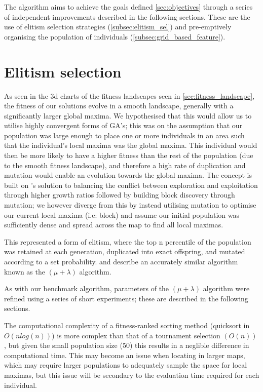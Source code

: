 \documentclass[authoryearcitations]{UoYCSproject}
\begin{document}
The algorithm aims to achieve the goals defined \autoref{sec:objectives} through a series of independent improvements described in the following sections. These are the use of elitism selection strategies (\autoref{subsec:elitism_sel}) and pre-emptively organising the population of individuals (\autoref{subsec:grid_based_feature}).


\section{Elitism selection}
\label{subsec:elitism_sel}
As seen in the 3d charts of the fitness landscapes seen in \autoref{sec:fitness_landscape}, the fitness of our solutions evolve in a smooth landscape, generally with a significantly larger global maxima. We hypothesised that this would allow us to utilise highly convergent forms of GA's; this was on the assumption that our population was large enough to place one or more individuals in an area such that the individual's local maxima was the global maxima. This individual would then be more likely to have a higher fitness than the rest of the population (due to the smooth fitness landscape), and therefore a high rate of duplication and mutation would enable an evolution towards the global maxima. The concept is built on \citet{David_E_Goldberg1991-es}'s solution to balancing the conflict between exploration and exploitation through higher growth ratios followed by building block discovery through mutation; we however diverge from this by instead utilising mutation to optimise our current local maxima (i.e: block) and assume our initial population was sufficiently dense and spread across the map to find all local maximas.
	
This represented a form of elitism, where the top n percentile of the population was retained at each generation, duplicated into exact offspring, and mutated according to a set probability. \citet{T_Back_D_B_Fogel_T_Michalewicz} and \citet{Shapiro1992-qm} describe an accurately similar algorithm known as the $(\mu + \lambda)$  algorithm.

As with our benchmark algorithm, parameters of the $(\mu + \lambda)$ algorithm were refined using a series of short experiments; these are described in the following sections.

The computational complexity of a fitness-ranked sorting method (quicksort in $O(n log (n))$) is more complex  \cite{Mitchell1998-td} than that of a tournament selection $(O(n))$ \cite{David_E_Goldberg1991-es}, but given the small population size (50) this results in a neglible difference in computational time. This may become an issue when locating in larger maps, which may require larger populations to adequately sample the space for local maximas, but this issue will be secondary to the evaluation time required for each individual.
\end{document}
